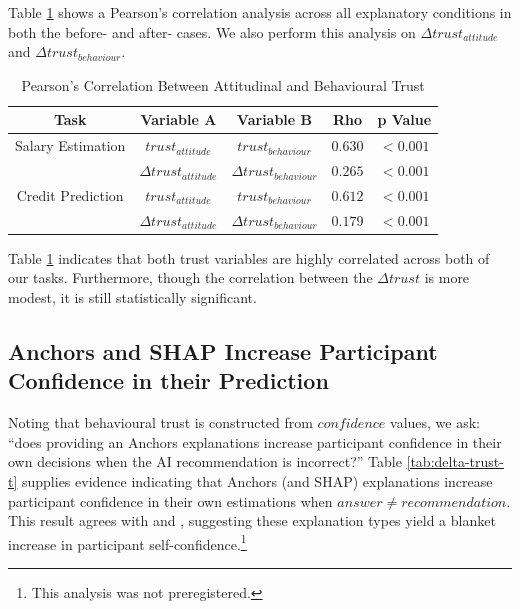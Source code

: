 Table \ref{tab:trust-correlation} shows a Pearson's correlation analysis across all explanatory conditions in both the before- and after- cases. We also perform this analysis on $\Delta trust_{attitude}$ and $\Delta trust_{behaviour}$.

\begin{table}[htbp]
    \caption{Pearson's Correlation Between Attitudinal and Behavioural Trust}
    \begin{center}
    \begin{tabular}{ccccc}
        \toprule
        Task & Variable A & Variable B & Rho & p Value \\
        \midrule
        Salary Estimation & $trust_{attitude}$ & $trust_{behaviour}$ & $\mathbf{0.630}$ & $\mathbf{<0.001}$ \\
        & $\Delta trust_{attitude}$ & $\Delta trust_{behaviour}$ & $\mathbf{0.265}$ & $\mathbf{<0.001}$ \\
        \midrule
        Credit Prediction & $trust_{attitude}$ & $trust_{behaviour}$ & $\mathbf{0.612}$ & $\mathbf{<0.001}$ \\
        & $\Delta trust_{attitude}$ & $\Delta trust_{behaviour}$ & $\mathbf{0.179}$ & $\mathbf{<0.001}$ \\
        \bottomrule
    \end{tabular}
    \label{tab:trust-correlation}
    \end{center}
\end{table}

Table \ref{tab:trust-correlation} indicates that both trust variables are highly correlated across both of our tasks. Furthermore, though the correlation between the $\Delta trust$ is more modest, it is still statistically significant.

\subsection{Anchors and SHAP Increase Participant Confidence in their Prediction}

Noting that behavioural trust is constructed from $confidence$ values, we ask: ``does providing an Anchors explanations increase participant confidence in their own decisions when the AI recommendation is incorrect?'' Table \ref{tab:delta-trust-t} supplies evidence indicating that Anchors (and SHAP) explanations increase participant confidence in their own estimations when $answer \neq recommendation$. This result agrees with \textcite{wan_explainabilitys_2022} and \textcite{bansal_does_2021}, suggesting these explanation types yield a blanket increase in participant self-confidence.\footnote{This analysis was not preregistered.}

